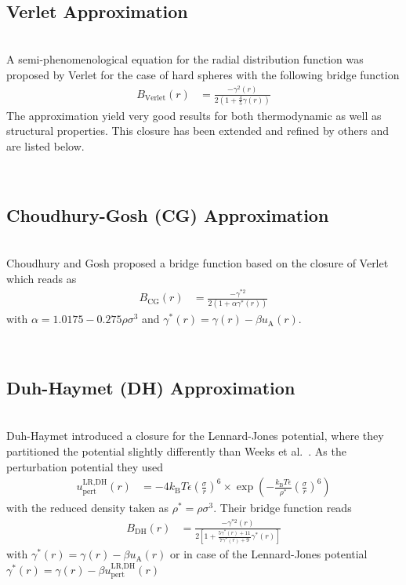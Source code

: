 \vphantom{.}~\\
\subsection{Verlet Approximation}
\label{sec:Verlet}~\\

A semi-phenomenological equation for the radial distribution function was proposed by Verlet
\cite{Verlet1980,Verlet1981} for the case of hard spheres with the following bridge function
\begin{align} \label{eq:ozVerlet}
B_\text{Verlet}(r)
&=\frac{-\gamma^2(r)}{2\left(1+\frac{4}{5}\gamma(r)\right)}
\end{align}
The approximation yield very good results for both thermodynamic as well as structural properties.
This closure has been extended and refined by others and are listed below.


\vphantom{.}~\\
\subsection{Choudhury-Gosh (CG) Approximation}
~\\

Choudhury and Gosh \cite{Choudhury2002} proposed a bridge function based on the closure of Verlet
which reads as
\begin{align}
B_\text{CG}(r) &=
\frac{-\gamma^{*2}}{2\left(1+\alpha\gamma^*(r)\right)}
\end{align}
with $\alpha=1.0175-0.275\rho\sigma^3$ and $\gamma^*(r)=\gamma(r)-\beta u_\text{A}(r)$.

~\\
\subsection{Duh-Haymet (DH) Approximation }
~\\

Duh-Haymet \cite{Duh1995} introduced a closure for the Lennard-Jones potential,
where they partitioned the potential slightly differently than Weeks et al.\ \cite{Weeks1971}.
As the perturbation potential they used
\begin{align}
u^\text{LR,DH}_\text{pert}(r) &= -4k_\text{B}T\epsilon\left(\frac{\sigma}{r}\right)^6
\times \exp \left( -\frac{k_\text{B}T\epsilon}{\rho^*} \left(\frac{\sigma}{r}\right)^6 \right)
\end{align}
with the reduced density taken as $\rho^*=\rho\sigma^3$. Their bridge function reads
\begin{align}
B_\text{DH}(r) &=
\frac{-\gamma^{*2}(r)}{2\left[1+\frac{5\gamma^*(r)+11}{7\gamma^*(r)+9}\gamma^*(r)\right]}
\end{align}
with $\gamma^*(r) = \gamma(r) - \beta u_\text{A}(r)$ or in case of the Lennard-Jones potential
$\gamma^*(r) = \gamma(r) - \beta u^\text{LR,DH}_\text{pert}(r)$


